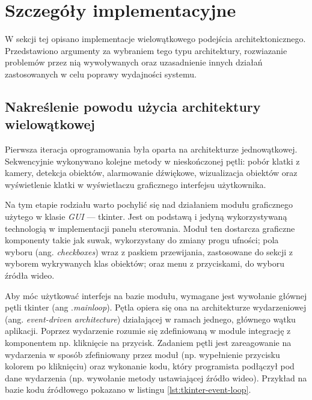 \section{Szczegóły implementacyjne}
\label{chap:szczegoly-implementacji}
W sekcji tej opisano implementacje wielowątkowego podejścia architektonicznego. Przedstawiono argumenty za wybraniem tego typu architektury, rozwiazanie problemów przez nią wywoływanych oraz uzasadnienie innych działań zastosowanych w celu poprawy wydajności systemu.  

\subsection{Nakreślenie powodu użycia architektury wielowątkowej}
Pierwsza iteracja oprogramowania była oparta na architekturze jednowątkowej. Sekwencyjnie wykonywano kolejne metody w nieskończonej pętli: pobór klatki z kamery, detekcja obiektów, alarmowanie dźwiękowe, wizualizacja obiektów oraz wyświetlenie klatki w wyświetlaczu graficznego interfejsu użytkownika.

Na tym etapie rodziału warto pochylić się nad działaniem modułu graficznego użytego w klasie \emph{GUI} --- tkinter. 
Jest on podstawą i jedyną wykorzystywaną technologią w implementacji panelu sterowania. Moduł ten dostarcza graficzne komponenty takie jak suwak, wykorzystany do zmiany progu ufności; pola wyboru (ang. \emph{checkboxes}) wraz z paskiem przewijania, zastosowane do sekcji z wyborem wykrywanych klas obiektów; oraz menu z przyciskami, do wyboru źródła wideo. 

Aby móc użytkować interfejs na bazie modułu, wymagane jest wywołanie głównej pętli tkinter (ang .\emph{mainloop}). Pętla opiera się ona na architekturze wydarzeniowej (ang. \emph{event-driven architecture}) działającej w ramach jednego, głównego wątku aplikacji. Poprzez wydarzenie rozumie się zdefiniowaną w module integrację z komponentem np. kliknięcie na przycisk. Zadaniem pętli jest zareagowanie na wydarzenia w sposób zfefiniowany przez moduł (np. wypełnienie przycisku kolorem po kliknięciu) oraz wykonanie kodu, który programista podłączył pod dane wydarzenia (np. wywołanie metody ustawiającej źródło wideo). Przykład na bazie kodu źródłowego pokazano w listingu \ref{lst:tkinter-event-loop}.


